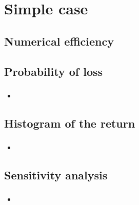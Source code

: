 \section{Simple case}

\subsection{Numerical efficiency}
\begin{frame}
\frametitle{\insertsection}
\textbf{\insertsubsection}
\begin{figure}
	\centering
\end{figure}
\end{frame}

\subsection{Probability of loss}
\begin{frame}
\frametitle{\insertsection}
\textbf{\insertsubsection}
\begin{itemize}
	\item []
\end{itemize}
\end{frame}

\subsection{Histogram of the return}
\begin{frame}
\frametitle{\insertsection}
\textbf{\insertsubsection}
\begin{itemize}
	\item []
\end{itemize}
\end{frame}

\subsection{Sensitivity analysis}
\begin{frame}
\frametitle{\insertsection}
\textbf{\insertsubsection}
\begin{itemize}
	\item []
\end{itemize}
\end{frame}